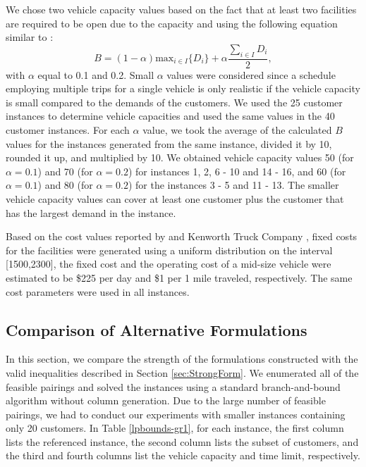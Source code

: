 \documentclass[11pt]{article}
\begin{document}
We chose two vehicle capacity values based on the fact that
at least two facilities are required to be open due to the capacity
and using the following equation similar to \citet{Laporte86}: 
\begin{equation}
\label{veccap-calc}
B = (1-\alpha) \mbox{max}_{i \in I}\{D_i\} + \alpha \frac{\sum_{i \in I}D_i}{2},
\end{equation}   
with $\alpha$ equal to 0.1 and 0.2. Small $\alpha$ values were considered since
a schedule employing multiple trips for a single vehicle is only realistic 
if the vehicle capacity is small compared to the demands of the customers. 
We used the 25 customer instances to determine vehicle capacities and used 
the same values in the 40 customer instances. 
For each $\alpha$ value, we took the average of the calculated $B$ values
for the instances generated from the same \citet{Cordeau} instance, divided it by 10, 
rounded it up, and multiplied by 10.  
We obtained vehicle capacity values 50 (for $\alpha=0.1$) and  70 (for $\alpha=0.2$) 
for instances 1, 2, 6 - 10 and 14 - 16,  and 60 (for $\alpha=0.1$) and 80 (for $\alpha=0.2$) 
for the instances 3 - 5 and 11 - 13. The smaller vehicle capacity values can cover 
at least one customer plus the customer that has the largest demand in the instance. 

Based on the cost values reported by \citet{Burlett} and  Kenworth Truck Company 
\citeyearpar{Kenworth}, fixed costs for the facilities were generated 
using a uniform distribution on the interval [1500,2300], 
the fixed cost and the operating cost of a mid-size vehicle were estimated to be 
\$225 per day and \$1 per 1 mile traveled, respectively.
The same cost parameters were used in all instances.


\subsection{Comparison of Alternative Formulations}
\label{alternativeForm}
In this section, we compare the strength of the formulations constructed with
the valid inequalities described in Section \ref{sec:StrongForm}.  
We enumerated all of the feasible pairings and solved the instances using a 
standard branch-and-bound algorithm without column generation.  
Due to the large number of feasible pairings, 
we had to conduct our experiments with smaller instances containing only 20 customers. 
In Table \ref{lpbounds-gr1}, for each instance, the first column lists the referenced
\citet{Cordeau} instance, the second column lists the subset of customers,
and the third and fourth columns list the vehicle capacity and time limit, 
respectively.  
\end{document}
